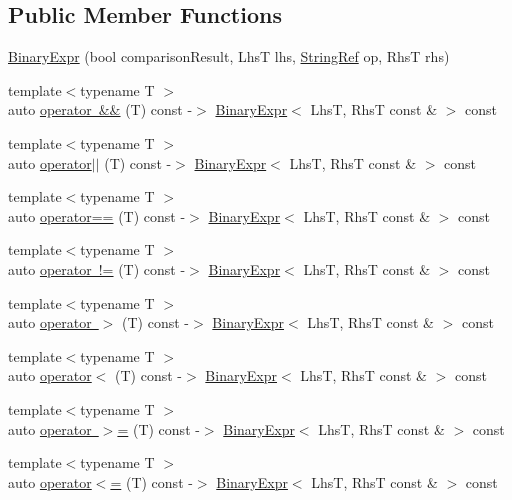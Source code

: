 \subsection*{Public Member Functions}
\begin{DoxyCompactItemize}
\item 
\mbox{\hyperlink{class_catch_1_1_binary_expr_a657d66346aef97a760c22776fe6008b6}{Binary\+Expr}} (bool comparison\+Result, LhsT lhs, \mbox{\hyperlink{class_catch_1_1_string_ref}{String\+Ref}} op, RhsT rhs)
\item 
{\footnotesize template$<$typename T $>$ }\\auto \mbox{\hyperlink{class_catch_1_1_binary_expr_a46d218bd9e184e6b9a940df77c64f729}{operator \&\&}} (T) const -\/$>$ \mbox{\hyperlink{class_catch_1_1_binary_expr}{Binary\+Expr}}$<$ LhsT, RhsT const \& $>$ const
\item 
{\footnotesize template$<$typename T $>$ }\\auto \mbox{\hyperlink{class_catch_1_1_binary_expr_a331e53968b1a2f92827c35721cc7eded}{operator$\vert$$\vert$}} (T) const -\/$>$ \mbox{\hyperlink{class_catch_1_1_binary_expr}{Binary\+Expr}}$<$ LhsT, RhsT const \& $>$ const
\item 
{\footnotesize template$<$typename T $>$ }\\auto \mbox{\hyperlink{class_catch_1_1_binary_expr_a245bffd2aab2f560814739986710aaf1}{operator==}} (T) const -\/$>$ \mbox{\hyperlink{class_catch_1_1_binary_expr}{Binary\+Expr}}$<$ LhsT, RhsT const \& $>$ const
\item 
{\footnotesize template$<$typename T $>$ }\\auto \mbox{\hyperlink{class_catch_1_1_binary_expr_a4bbd87a1dc9759185432fce44765d4f5}{operator !=}} (T) const -\/$>$ \mbox{\hyperlink{class_catch_1_1_binary_expr}{Binary\+Expr}}$<$ LhsT, RhsT const \& $>$ const
\item 
{\footnotesize template$<$typename T $>$ }\\auto \mbox{\hyperlink{class_catch_1_1_binary_expr_a93f643d30d7617ab7a2a50dfaccde029}{operator $>$}} (T) const -\/$>$ \mbox{\hyperlink{class_catch_1_1_binary_expr}{Binary\+Expr}}$<$ LhsT, RhsT const \& $>$ const
\item 
{\footnotesize template$<$typename T $>$ }\\auto \mbox{\hyperlink{class_catch_1_1_binary_expr_a7e6c3dcf59b3cd51e7c82355da3ef451}{operator$<$}} (T) const -\/$>$ \mbox{\hyperlink{class_catch_1_1_binary_expr}{Binary\+Expr}}$<$ LhsT, RhsT const \& $>$ const
\item 
{\footnotesize template$<$typename T $>$ }\\auto \mbox{\hyperlink{class_catch_1_1_binary_expr_a5b61ffcbbfd28c40bd25bb56599df489}{operator $>$=}} (T) const -\/$>$ \mbox{\hyperlink{class_catch_1_1_binary_expr}{Binary\+Expr}}$<$ LhsT, RhsT const \& $>$ const
\item 
{\footnotesize template$<$typename T $>$ }\\auto \mbox{\hyperlink{class_catch_1_1_binary_expr_a5590a2c5f5074ca2509c09b92bfcdf57}{operator$<$=}} (T) const -\/$>$ \mbox{\hyperlink{class_catch_1_1_binary_expr}{Binary\+Expr}}$<$ LhsT, RhsT const \& $>$ const
\end{DoxyCompactItemize}
